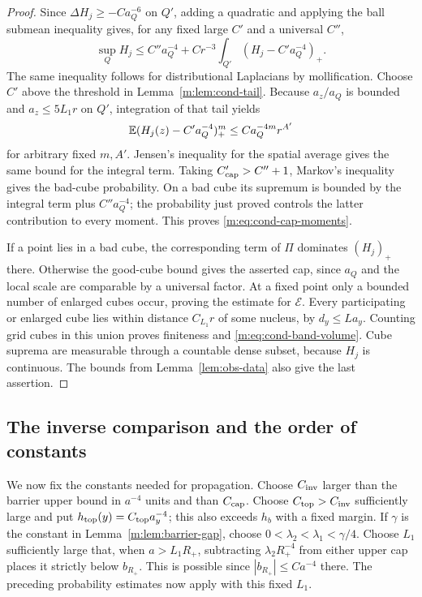 \begin{proof}
Since $\Delta H_j\ge-Ca_Q^{-6}$ on $Q'$, adding a quadratic and
applying the ball submean inequality gives, for any fixed large $C'$
and a universal $C''$,
\[
 \sup_QH_j\le C''a_Q^{-4}
       +Cr^{-3}\int_{Q'}(H_j-C'a_Q^{-4})_+.
\]
The same inequality follows for distributional Laplacians by
mollification. Choose $C'$ above the threshold in
Lemma~\ref{m:lem:cond-tail}. Because $a_z/a_Q$ is bounded and
$a_z\le5L_1r$ on $Q'$, integration of that tail yields
\[
 \mathbb E(H_j(z)-C'a_Q^{-4})_+^m
       \le C a_Q^{-4m}r^{A'}
\]
for arbitrary fixed $m,A'$. Jensen's inequality for the spatial
average gives the same bound for the integral term. Taking
$C'_{\rm cap}>C''+1$, Markov's inequality gives the bad-cube
probability. On a bad cube its supremum is bounded by the integral
term plus $C''a_Q^{-4}$; the probability just proved controls the
latter contribution to every moment. This proves
\eqref{m:eq:cond-cap-moments}.

If a point lies in a bad cube, the corresponding term of $\Pi$
dominates $(H_j)_+$ there. Otherwise the good-cube bound gives the
asserted cap, since $a_Q$ and the local scale are comparable by a
universal factor. At a fixed point only a bounded number of enlarged
cubes occur, proving the estimate for $\mathcal E$.
Every participating or enlarged cube lies within distance
$C_{L_1}r$ of some nucleus, by $d_y\le La_y$.
Counting grid cubes in this union proves finiteness and
\eqref{m:eq:cond-band-volume}.
Cube suprema are measurable through a countable dense subset,
because $H_j$ is continuous. The bounds from
Lemma~\ref{lem:obs-data} also give the last assertion.
\end{proof}

\subsection{The inverse comparison and the order of constants}

We now fix the constants needed for propagation. Choose $C_{\rm inv}$
larger than the barrier upper bound in $a^{-4}$ units and than
$C_{\rm cap}$. Choose $C_{\rm top}>C_{\rm inv}$ sufficiently large and
put $h_{\rm top}(y)=C_{\rm top}a_y^{-4}$; this also exceeds $h_b$ with
a fixed margin. If $\gamma$ is the constant in
Lemma~\ref{m:lem:barrier-gap}, choose
$0<\lambda_2<\lambda_1<\gamma/4$.
Choose $L_1$ sufficiently large that, when
$a>L_1R_+$, subtracting $\lambda_2R_+^{-4}$ from either upper cap
places it strictly below $b_{R_+}$. This is possible since
$|b_{R_+}|\le Ca^{-4}$ there. The preceding probability estimates
now apply with this fixed $L_1$.

